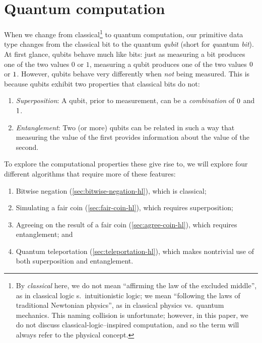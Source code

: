 \documentclass[12pt]{amsart}
\newif\ifdraft
\let\ket\relax
\newcommand{\asz}[1]{\ifdraft\textcolor{violet}{[ASZ: #1]}\fi}
\newcommand*{\term}[1]{\emph{#1}}
\begin{document}
\section{Quantum computation}\label{sec:quantum-computation}

When we change from classical\footnote{By \term{classical} here, we do not mean
``affirming the law of the excluded middle'', as in classical logic
 s.\ intuitionistic logic; we mean ``following the laws of traditional Newtonian
physics'', as in classical physics vs.\ quantum mechanics.  This naming
collision is unfortunate; however, in this paper, we do not discuss
classical-logic--inspired computation, and so the term will always refer to the
physical concept.\asz{This probably belongs earlier.}} to quantum computation,
our primitive data type changes from the classical bit to the quantum
\term{qubit} (short for \emph{qu}antum \emph{bit}).  At first glance, qubits
behave much like bits: just as measuring a bit produces one of the two values
$0$ or $1$, measuring a qubit produces one of the two values $\ket{0}$ or
$\ket{1}$.  However, qubits behave very differently when \emph{not} being
measured.  This is because qubits exhibit two properties that classical bits do
not:\asz{\term{superposition} and \term{entanglement}. -- does this belong
here?}
\begin{enumerate}
  \item \term{Superposition}: A qubit, prior to measurement, can be a
    \emph{combination} of $\ket{0}$ and $\ket{1}$.

  \item \term{Entanglement}: Two (or more) qubits can be related in such a way
    that measuring the value of the first provides information about the value
    of the second.\asz{This explanation doesn't make clear why entanglement is
    magic, and I don't really know how to explain this without the math.  I'll
    come back to this.}
\end{enumerate}

To explore the computational properties these give rise to, we will explore four
different algorithms that require more of these features:
\begin{enumerate}
  \item Bitwise negation (\cref{sec:bitwise-negation-hl}), which is classical;
  \item Simulating a fair coin (\cref{sec:fair-coin-hl}), which requires
    superposition;
  \item Agreeing on the result of a fair coin (\cref{sec:agree-coin-hl}), which
    requires entanglement; and
  \item Quantum teleportation (\cref{sec:teleportation-hl}), which makes
    nontrivial use of both superposition and entanglement.
\end{enumerate}
\end{document}
